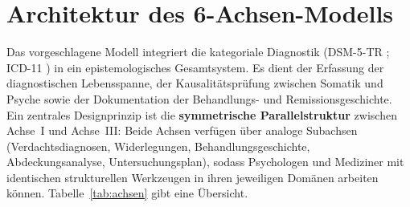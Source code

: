 \documentclass[11pt,a4paper]{article}
\begin{document}
\section{Architektur des 6-Achsen-Modells}
\label{sec:modell}

Das vorgeschlagene Modell integriert die kategoriale Diagnostik (DSM-5-TR \citep{APA2022}; ICD-11 \citep{WHO2019}) in ein epistemologisches Gesamtsystem. Es dient der Erfassung der diagnostischen Lebensspanne, der Kausalit\"atspr\"ufung zwischen Somatik und Psyche sowie der Dokumentation der Behandlungs- und Remissionsgeschichte. Ein zentrales Designprinzip ist die \textbf{symmetrische Parallelstruktur} zwischen Achse~I und Achse~III: Beide Achsen verf\"ugen \"uber analoge Subachsen (Verdachtsdiagnosen, Widerlegungen, Behandlungsgeschichte, Abdeckungsanalyse, Untersuchungsplan), sodass Psychologen und Mediziner mit identischen strukturellen Werkzeugen in ihren jeweiligen Dom\"anen arbeiten k\"onnen. Tabelle~\ref{tab:achsen} gibt eine \"Ubersicht.
\end{document}
